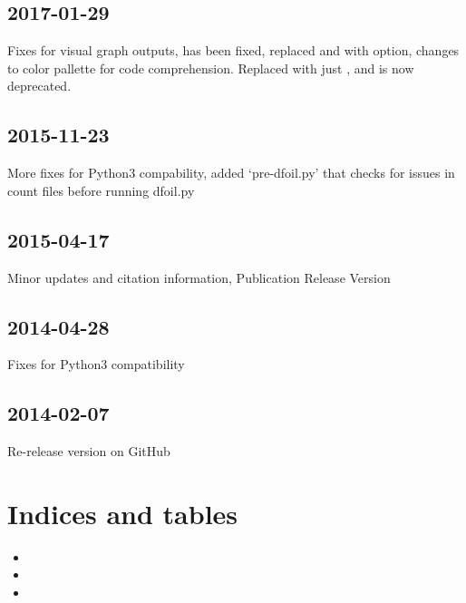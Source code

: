 \documentclass[letterpaper,12pt,english]{sphinxmanual}
\begin{document}
\section{2017-01-29}
\label{\detokenize{releases:id3}}
Fixes for visual graph outputs,  has been fixed, replaced  and  with  option, changes to color pallette for code comprehension. Replaced  with just , and  is now deprecated.


\section{2015-11-23}
\label{\detokenize{releases:id4}}
More fixes for Python3 compability, added ‘pre-dfoil.py’ that checks for issues in count files before running dfoil.py


\section{2015-04-17}
\label{\detokenize{releases:id5}}
Minor updates and citation information, Publication Release Version


\section{2014-04-28}
\label{\detokenize{releases:id6}}
Fixes for Python3 compatibility


\section{2014-02-07}
\label{\detokenize{releases:id7}}
Re-release version on GitHub


\chapter{Indices and tables}
\label{\detokenize{index:indices-and-tables}}\begin{itemize}
\item {} 

\item {} 

\item {} 

\end{itemize}



\renewcommand{\indexname}{Index}
\printindex
\end{document}

